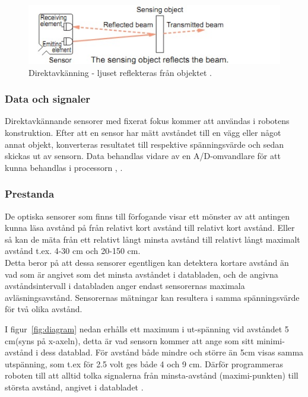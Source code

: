 \documentclass[11pt]{article}
\begin{document}
\begin{flushleft}
\begin{figure}[h]
\centering
\includegraphics[scale=1]{reflect}
\caption{Direktavkänning - ljuset reflekteras från objektet \autocite{Fotoceller}.}
\label{fig:reflect}
\end{figure}

\subsubsection{Data och signaler}
Direktavkännande sensorer med fixerat fokus kommer att användas i robotens konstruktion. Efter att en sensor har mätt avståndet till en vägg eller något annat objekt, konverteras resultatet till respektive spänningsvärde och sedan skickas ut av sensorn. Data behandlas vidare av en A/D-omvandlare för att kunna behandlas i processorn \autocite{Fotoceller}, \autocite{diagram1}.

\subsubsection{Prestanda}
De optiska sensorer som finns till förfogande visar ett mönster av att antingen kunna läsa avstånd på från relativt kort avstånd till relativt kort avstånd. Eller så kan de mäta från ett relativt långt minsta avstånd till relativt långt maximalt avstånd t.ex. 4-30 cm och 20-150 cm. 
\\[0.1in]
Detta beror på att dessa sensorer egentligen kan detektera kortare avstånd än vad som är angivet som det minsta avståndet i databladen, och de angivna avståndsintervall i databladen anger endast sensorernas maximala avläsningsavstånd. Sensorernas mätningar kan resultera i samma spänningsvärde för två olika avstånd.

\pagebreak

I figur~\ref{fig:diagram} nedan erhålls ett maximum i ut-spänning vid avståndet 5 cm(syns på x-axeln), detta är vad sensorn kommer att ange som sitt minimi-avstånd i dess datablad. För avstånd både mindre och större än 5cm visas samma utspänning, som t.ex för 2.5 volt ges både 4 och 9 cm. Därför programmeras roboten till att alltid tolka signalerna från minsta-avstånd (maximi-punkten) till största avstånd, angivet i databladet \autocite{diagram1}.
\\[0.1in]


\end{flushleft}
\end{document}

